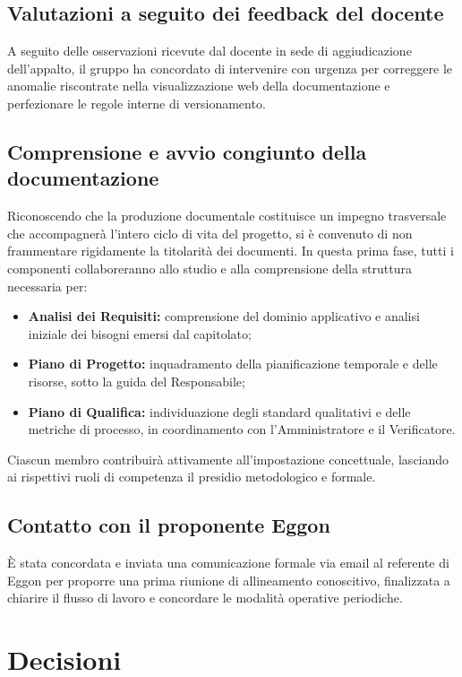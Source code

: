\documentclass[interno]{gpt}
\begin{document}
\subsection{Valutazioni a seguito dei feedback del docente}
A seguito delle osservazioni ricevute dal docente in sede di aggiudicazione dell'appalto, il gruppo ha concordato di intervenire con urgenza per correggere le anomalie riscontrate nella visualizzazione web della documentazione e perfezionare le regole interne di versionamento.

\subsection{Comprensione e avvio congiunto della documentazione}
Riconoscendo che la produzione documentale costituisce un impegno trasversale che accompagnerà l'intero ciclo di vita del progetto, si è convenuto di non frammentare rigidamente la titolarità dei documenti. In questa prima fase, tutti i componenti collaboreranno allo studio e alla comprensione della struttura necessaria per:
\begin{itemize}
  \item \textbf{Analisi dei Requisiti:} comprensione del dominio applicativo e analisi iniziale dei bisogni emersi dal capitolato;
  \item \textbf{Piano di Progetto:} inquadramento della pianificazione temporale e delle risorse, sotto la guida del Responsabile;
  \item \textbf{Piano di Qualifica:} individuazione degli standard qualitativi e delle metriche di processo, in coordinamento con l'Amministratore e il Verificatore.
\end{itemize}
Ciascun membro contribuirà attivamente all'impostazione concettuale, lasciando ai rispettivi ruoli di competenza il presidio metodologico e formale.

\subsection{Contatto con il proponente Eggon}
È stata concordata e inviata una comunicazione formale via email al referente di Eggon per proporre una prima riunione di allineamento conoscitivo, finalizzata a chiarire il flusso di lavoro e concordare le modalità operative periodiche.

\section{Decisioni}
\begin{decisioni}
\end{decisioni}
\end{document}
